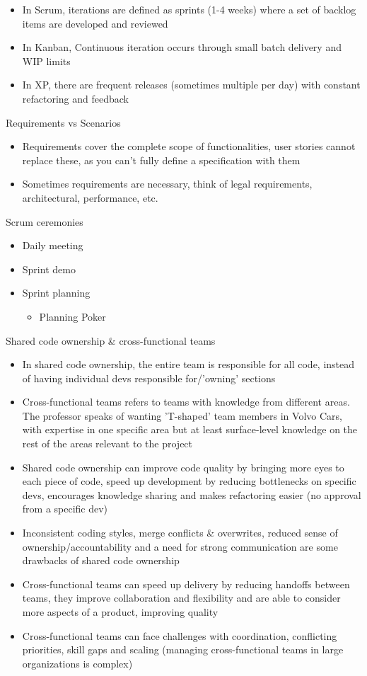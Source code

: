 \documentclass[10pt]{article}
\begin{document}
\begin{itemize}
\item In Scrum, iterations are defined as sprints (1-4 weeks) where a set of backlog items are developed and reviewed
\item In Kanban, Continuous iteration occurs through small batch delivery and WIP limits
\item In XP, there are frequent releases (sometimes multiple per day) with constant refactoring and feedback
\end{itemize}
Requirements vs Scenarios
\begin{itemize}
\item Requirements cover the complete scope of functionalities, user stories cannot replace these, as you can't fully define a specification with them
\item Sometimes requirements are necessary, think of legal requirements, architectural, performance, etc.
\end{itemize}
Scrum ceremonies
\begin{itemize}
\item Daily meeting
\item Sprint demo
\item Sprint planning
\begin{itemize}
\item Planning Poker
\end{itemize}
\end{itemize}
Shared code ownership \& cross-functional teams
\begin{itemize}
\item In shared code ownership, the entire team is responsible for all code, instead of having individual devs responsible for/'owning' sections
\item Cross-functional teams refers to teams with knowledge from different areas. The professor speaks of wanting 'T-shaped' team members in Volvo Cars, with expertise in one specific area but at least surface-level knowledge on the rest of the areas relevant to the project
\end{itemize}
\begin{itemize}
\item Shared code ownership can improve code quality by bringing more eyes to each piece of code, speed up development by reducing bottlenecks on specific devs, encourages knowledge sharing and makes refactoring easier (no approval from a specific dev)
\item Inconsistent coding styles, merge conflicts \& overwrites, reduced sense of ownership/accountability and a need for strong communication are some drawbacks of shared code ownership
\item Cross-functional teams can speed up delivery by reducing handoffs between teams, they improve collaboration and flexibility and are able to consider more aspects of a product, improving quality
\item Cross-functional teams can face challenges with coordination, conflicting priorities, skill gaps and scaling (managing cross-functional teams in large organizations is complex)
\end{itemize}
\end{document}
